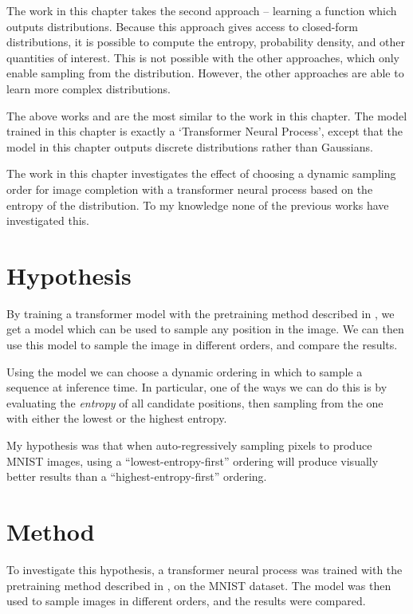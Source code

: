 The work in this chapter takes the second approach -- learning a function which outputs distributions. Because this approach gives access to closed-form distributions, it is possible to compute the entropy, probability density, and other quantities of interest. This is not possible with the other approaches, which only enable sampling from the distribution. However, the other approaches are able to learn more complex distributions.

The above works \cite{transformer-neural-processes} and  \cite{transformers-bayesian} are the most similar to the work in this chapter. The model trained in this chapter is exactly a `Transformer Neural Process', except that the model in this chapter outputs discrete distributions rather than Gaussians.

The work in this chapter investigates the effect of choosing a dynamic sampling order for image completion with a transformer neural process based on the entropy of the distribution. To my knowledge none of the previous works have investigated this.

\section{Hypothesis}
\label{s:a-o-hypotheses}

By training a transformer model with the pretraining method described in , we get a model which can be used to sample any position in the image. We can then use this model to sample the image in different orders, and compare the results.

Using the model we can choose a dynamic ordering in which to sample a sequence at inference time. In particular, one of the ways we can do this is by evaluating the \textit{entropy} of all candidate positions, then sampling from the one with either the lowest or the highest entropy.

My hypothesis was that when auto-regressively sampling pixels to produce MNIST images, using a ``lowest-entropy-first'' ordering will produce visually better results than a ``highest-entropy-first'' ordering.

\section{Method}

To investigate this hypothesis, a transformer neural process was trained with the pretraining method described in , on the MNIST dataset. The model was then used to sample images in different orders, and the results were compared.

